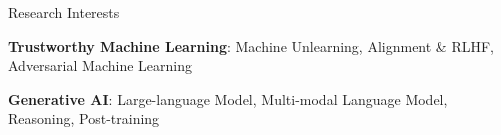 \begin{rSection}{Research Interests}

\small{\textbf{Trustworthy Machine Learning}: Machine Unlearning, Alignment \& RLHF, Adversarial Machine Learning }

\small{\textbf{Generative AI}: Large-language Model, Multi-modal Language Model, Reasoning, Post-training}


\end{rSection}